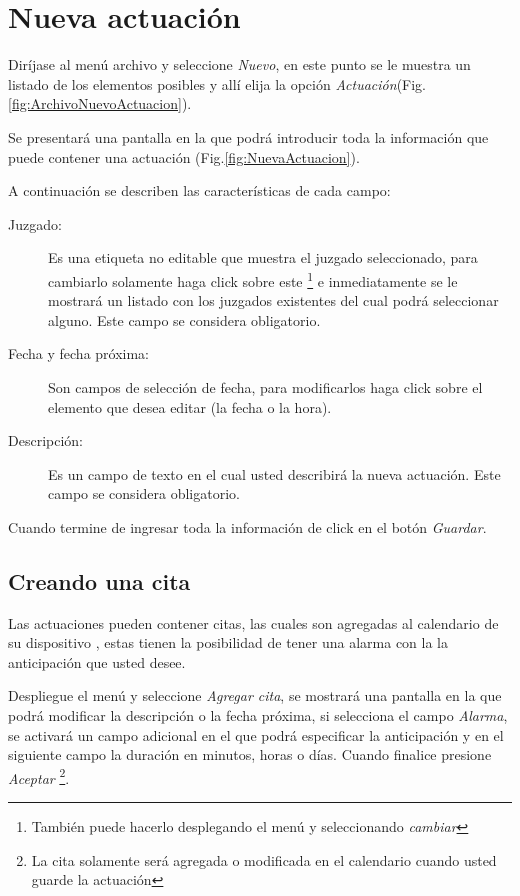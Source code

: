 \section{Nueva actuaci\'on}
\label{sec:nuevaActuacion}
Dir\'ijase al men\'u archivo y seleccione \emph{Nuevo}, en este punto se le muestra un listado de los elementos posibles y
all\'i elija la opci\'on \emph{Actuaci\'on}(Fig.\ref{fig:ArchivoNuevoActuacion}). 
  

Se presentar\'a una pantalla en la que podr\'a introducir toda la informaci\'on
que puede contener una actuaci\'on (Fig.\ref{fig:NuevaActuacion}). 
  

 A continuaci\'on se describen las
caracter\'isticas de cada campo:

\begin{description}
\item[Juzgado:]Es una etiqueta no editable que muestra el juzgado
seleccionado, para cambiarlo solamente haga click sobre este
\footnote{Tambi\'en puede hacerlo desplegando el men\'u \blackberry y
seleccionando \emph{cambiar}}
e inmediatamente se le mostrar\'a un listado con los juzgados existentes del
cual podr\'a seleccionar alguno. Este campo se considera obligatorio.
\item[Fecha y fecha pr\'oxima:]Son campos de selecci\'on de fecha, para
modificarlos haga click sobre el elemento que desea editar (la fecha o la hora).
\item[Descripci\'on:]Es un campo de texto en el cual usted describir\'a la
nueva actuaci\'on. Este campo se considera obligatorio.
\end{description}

Cuando termine de ingresar toda la informaci\'on de click en el bot\'on \emph{Guardar}.

\subsection{Creando una cita}
\label{sec:crearCita}
Las actuaciones pueden contener citas, las cuales son agregadas al calendario
de su dispositivo \blackberry, estas tienen la posibilidad de tener una alarma
con la la anticipaci\'on que usted desee.

Despliegue el men\'u \blackberry y seleccione \emph{Agregar cita}, se mostrar\'a una
pantalla en la que podr\'a modificar la descripci\'on o la fecha pr\'oxima,
si selecciona el campo \emph{Alarma}, se activar\'a un campo adicional en el
que podr\'a especificar la anticipaci\'on y en el siguiente campo la duraci\'on
en minutos, horas o d\'ias. Cuando finalice presione \emph{Aceptar}
\footnote{La cita solamente ser\'a agregada o modificada en el calendario cuando
usted guarde la actuaci\'on}.

